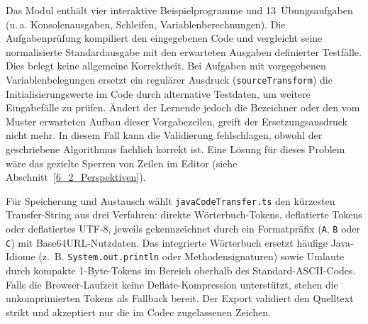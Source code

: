 
Das Modul enthält vier interaktive Beispielprogramme und 13~Übungsaufgaben (u.\,a. Konsolenausgaben, Schleifen, Variablenberechnungen).
Die Aufgabenprüfung kompiliert den eingegebenen Code und vergleicht seine normalisierte Standardausgabe mit den erwarteten Ausgaben definierter Testfälle. Dies belegt keine allgemeine Korrektheit. Bei Aufgaben mit vorgegebenen Variablenbelegungen ersetzt ein regulärer Ausdruck (\verb|sourceTransform|) die Initialisierungswerte im Code durch alternative Testdaten, um weitere Eingabefälle zu prüfen. Ändert der Lernende jedoch die Bezeichner oder den vom Muster erwarteten Aufbau dieser Vorgabezeilen, greift der Ersetzungsausdruck nicht mehr. In diesem Fall kann die Validierung fehlschlagen, obwohl der geschriebene Algorithmus fachlich korrekt ist. Eine Lösung für dieses Problem wäre das gezielte Sperren von Zeilen im Editor (siehe Abschnitt~\ref{6_2_Perspektiven}).

Für Speicherung und Austausch wählt \verb|javaCodeTransfer.ts| den kürzesten Transfer-String aus drei Verfahren: direkte Wörterbuch-Tokens, deflatierte Tokens oder deflatiertes UTF-8, jeweils gekennzeichnet durch ein Formatpräfix (\texttt{A}, \texttt{B} oder \texttt{C}) mit Base64URL-Nutzdaten. Das integrierte Wörterbuch ersetzt häufige Java-Idiome (z.\ B. \texttt{System.out.println} oder Methodensignaturen) sowie Umlaute durch kompakte 1-Byte-Tokens im Bereich oberhalb des Standard-ASCII-Codes. Falls die Browser-Laufzeit keine Deflate-Kompression unterstützt, stehen die unkomprimierten Tokens als Fallback bereit. Der Export validiert den Quelltext strikt und akzeptiert nur die im Codec zugelassenen Zeichen.
